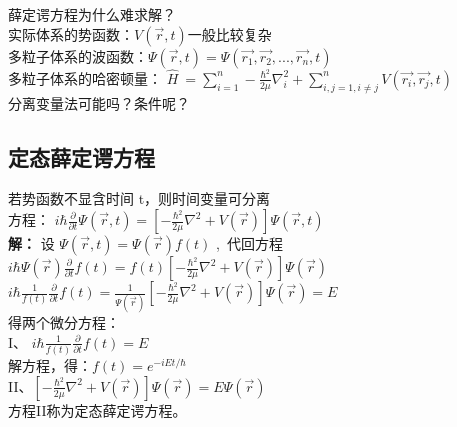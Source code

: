 \begin{remark}
薛定谔方程为什么难求解？\\ 
实际体系的势函数：$V(\vec{r},t ) $一般比较复杂\\ 
多粒子体系的波函数：$ \displaystyle  \Psi (\vec{r},t ) =\Psi (\vec{r_1},\vec{r_2},...,\vec{r_n},t ) $  \\ 
多粒子体系的哈密顿量： $ \displaystyle  \hat{H} ~=\sum_{i=1}^{n} -\frac{\hbar^2}{2\mu }\nabla ^2 _i + \sum_{i,j=1, i\ne j}^{n}  V(\vec{r_i},\vec{r_j},t ) $ \\ 
分离变量法可能吗？条件呢？
\end{remark}

\subsection{定态薛定谔方程}
若势函数不显含时间 t，则时间变量可分离 \\
方程： { $ \displaystyle i \hbar \frac{\partial }{\partial t} \Psi (\vec{r},t ) =\left [- \frac{\hbar^2}{2\mu }\nabla ^2 + V(\vec{r}) \right ]\Psi (\vec{r},t ) $}  \\ 
\textbf{解：} 设  $\Psi (\vec{r},t )  = \Psi (\vec{r} ) f(t) $ , 代回方程 \\ 
{ $ \displaystyle i\hbar \Psi (\vec{r})  \frac{\partial }{\partial t} f(t)=f(t) \left [ -\frac{\hbar^2}{2\mu }\nabla ^2 + V(\vec{r}) \right ]\Psi (\vec{r}) $}  \\ 	
{ $ \displaystyle i\hbar \frac{1}{f(t)}  \frac{\partial }{\partial t} f(t)= \frac{1}{\Psi (\vec{r}) } \left [ -\frac{\hbar^2}{2\mu }\nabla ^2 + V(\vec{r}) \right ]\Psi (\vec{r}) =E $}  \\ 	
得两个微分方程：\\ 
{I、 $ \displaystyle  i\hbar \frac{1}{f(t)}  \frac{\partial }{\partial t} f(t)=E $ } \\ 
解方程，得：$\displaystyle  f(t) =e^{-iEt/\hbar}$ \\
{II、$\displaystyle   \left [ -\frac{\hbar^2}{2\mu }\nabla ^2 + V(\vec{r}) \right ]\Psi (\vec{r}) =E \Psi (\vec{r})  $  } \\ 
方程II称为定态薛定谔方程。
